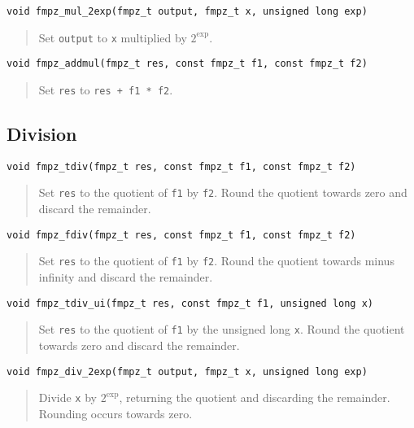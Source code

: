 \documentclass[a4paper,10pt]{article}
\newcommand{\code}{\lstinline}
\begin{document}
\begin{lstlisting}
void fmpz_mul_2exp(fmpz_t output, fmpz_t x, unsigned long exp)
\end{lstlisting}
\begin{quote}
Set \code{output} to \code{x} multiplied by $2^{\mbox{exp}}$.
\end{quote}

\begin{lstlisting}
void fmpz_addmul(fmpz_t res, const fmpz_t f1, const fmpz_t f2)
\end{lstlisting}
\begin{quote}
Set \code{res} to \code{res + f1 * f2}.
\end{quote}

\subsection{Division}

\begin{lstlisting}
void fmpz_tdiv(fmpz_t res, const fmpz_t f1, const fmpz_t f2)
\end{lstlisting}
\begin{quote}
Set \code{res} to the quotient of \code{f1} by \code{f2}. Round the quotient towards zero and discard the remainder.
\end{quote}

\begin{lstlisting}
void fmpz_fdiv(fmpz_t res, const fmpz_t f1, const fmpz_t f2)
\end{lstlisting}
\begin{quote}
Set \code{res} to the quotient of \code{f1} by \code{f2}. Round the quotient towards minus infinity and discard the remainder.
\end{quote}

\begin{lstlisting}
void fmpz_tdiv_ui(fmpz_t res, const fmpz_t f1, unsigned long x)
\end{lstlisting}
\begin{quote}
Set \code{res} to the quotient of \code{f1} by the unsigned long \code{x}. Round the quotient towards zero and discard the remainder.
\end{quote}

\begin{lstlisting}
void fmpz_div_2exp(fmpz_t output, fmpz_t x, unsigned long exp)
\end{lstlisting}
\begin{quote}
Divide \code{x} by $2^{\mbox{exp}}$, returning the quotient and discarding the remainder. Rounding occurs towards zero.
\end{quote}
\end{document}
